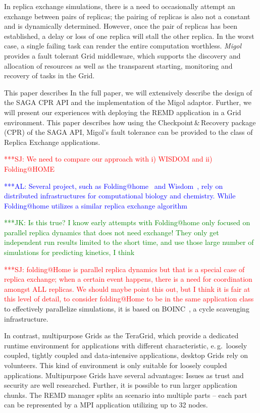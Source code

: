\documentclass[times, 10pt,twocolumn]{article}
\newcommand{\kimnote}[1]{ {\textcolor{green} { ***JK: #1 }}}
\newcommand{\alnote}[1]{ {\textcolor{blue} { ***AL: #1 }}}
\newcommand{\jhanote}[1]{ {\textcolor{red} { ***SJ: #1 }}}
\begin{document}
In replica exchange simulations, there is a need to occasionally attempt an exchange
between pairs of replicas; the pairing of replicas is also not a
constant and is dynamically determined. However, once the pair of
replicas has been established, a delay or loss of one replica will
stall the other replica. In the worst case, a single failing task can
render the entire computation worthless.
\emph{Migol}~\cite{schnorLuckow08} provides a fault tolerant Grid
middleware, which supports the discovery and allocation of resources
as well as the transparent starting, monitoring and recovery of tasks in the Grid.          



This paper describes In the full paper, we will extensively  describe the design of the SAGA CPR API and the implementation 
of the Migol adaptor. Further, we will present our experiences with deploying  
the REMD application in a Grid environment.
This paper describes how using the Checkpoint\,\&\,Recovery package
(CPR) of the SAGA API, Migol's fault tolerance can be provided to the
class of Replica Exchange applications.   

\jhanote{We need to compare our approach with i) WISDOM and ii)
  Folding@HOME}             

\alnote{Several project, such as Folding@home~\cite{folding} and
  Wisdom~\cite{wisdom}, rely on distributed infrastructures for
  computational biology and chemistry. While Folding@home utilizes a
  similar replica exchange algorithm~\cite{PhysRevLett.86.4983}}

  \kimnote{Is this true? I know early attempts with Folding@home only
    focused on parallel replica dynamics that does not need exchange!
    They only get independent run results limited to the short time,
    and use those large number of simulations for predicting kinetics,
    I think}


  \jhanote{folding@Home is parallel replica dynamics but that is a
    special case of replica exchange; when a certain event happens,
    there is a need for coordination amongst ALL replicas. We should
    maybe point this out, but I think it is fair at this level of
    detail, to consider folding@Home to be in the same application
    class} to effectively parallelize simulations, it is based on
  BOINC~\cite{1033223}, a cycle scavenging infrastructure.

  In contrast, multipurpose Grids as the TeraGrid, which provide a
  dedicated runtime environment for applications with different
  characteristic, e.\,g.\ loosely coupled, tightly coupled and
  data-intensive applications, desktop Grids rely on volunteers. This
  kind of environment is only suitable for loosely coupled
  applications. Multipurpose Grids have several advantages: Issues as
  trust and security are well researched. Further, it is possible to
  run larger application chunks. The REMD manager splits an scenario
  into multiple parts -- each part can be represented by a MPI
  application utilizing up to 32 nodes.
\end{document}
